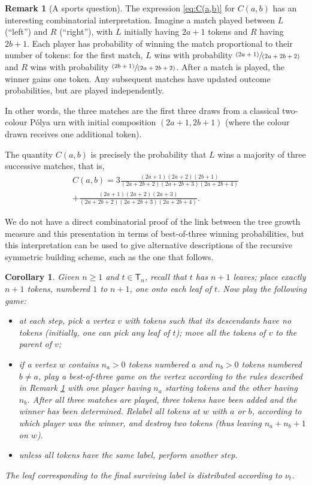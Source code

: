 \documentclass[JEP,XML,SOM,Unicode,NoFloatCountersInSection, NoEqCountersInSection,published]{cedram}
\newcommand{\pspfrac}[2]{\sfrac{(#1)}{(#2)}}
\newcommand{\sT}{\mathsf{T}}
\newtheorem{cor}[thm]{Corollary}
\theoremstyle{definition}
\newtheorem{rem}[thm]{Remark}
\begin{document}
\begin{rem}[A sports question] \label{rem:best of three}
The expression \eqref{eq:C(a,b)} for $C(a,b)$ has an interesting combinatorial interpretation. Imagine a match played between $L$ (``left'') and $R$ (``right''), with $L$ initially having $2a+1$ tokens and $R$ having $2b+1$. Each player has probability of winning the match proportional to their number of tokens: for the first match, $L$ wins with probability $\pspfrac{2a+1}{2a+2b+2}$ and $R$ wins with probability $\pspfrac{2b+1}{2a+2b+2}$. After a match is played, the winner gains one token. Any subsequent matches have updated outcome probabilities, but are played independently.

In other words, the three matches are the first three draws from a classical two-colour Pólya urn with initial composition $(2a+1,2b+1)$ (where the colour drawn receives one additional token).

The quantity $C(a,b)$ is precisely the probability that $L$ wins a majority of three successive matches, that is,
\begin{multline*}
C(a,b)=3\frac{(2a+1)(2a+2)(2b+1)}{(2a+2b+2)(2a+2b+3)(2a+2b+4)}\\
+\frac{(2a+1)(2a+2)(2a+3)}{(2a+2b+2)(2a+2b+3)(2a+2b+4)}.
\end{multline*}

We do not have a direct combinatorial proof of the link between the tree growth measure and this presentation in terms of best-of-three winning probabilities, but this interpretation can be used to give alternative descriptions of the recursive symmetric building scheme, such as the one that follows.
\end{rem}

\begin{cor}
Given $n\geq 1$ and $t\in\sT_n$, recall that $t$ has $n+1$ leaves; place exactly $n+1$ tokens, numbered $1$ to $n+1$, one onto each leaf of $t$. Now play the following game:
\begin{itemize}
\item at each step, pick a vertex $v$ with tokens such that its descendants have no tokens (initially, one can pick any leaf of $t$); move all the tokens of $v$ to the parent of $v$;
\item if a vertex $w$ contains $n_a>0$ tokens numbered $a$ and $n_b>0$ tokens numbered $b\neq a$, play a best-of-three game on the vertex according to the rules described in Remark \ref{rem:best of three} with one player having $n_a$ starting tokens and the other having $n_b$. After all three matches are played, three tokens have been added and the winner has been determined. Relabel all tokens at $w$ with $a$ or $b$, according to which player was the winner, and destroy two tokens (thus leaving $n_a+n_b+1$ on $w$).
\item unless all tokens have the same label, perform another step.
\end{itemize}

The leaf corresponding to the final surviving label is distributed according to $\nu_t$.
\end{cor}
\end{document}
